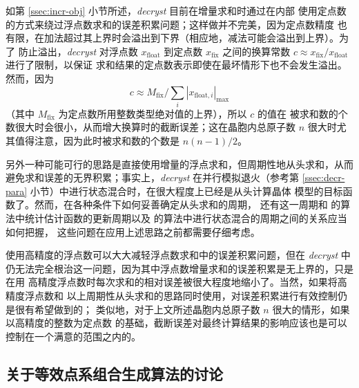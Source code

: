 如第 \ref{ssec:incr-obj} 小节所述，\emph{decryst} 目前在增量求和时通过在内部
使用定点数的方式来绕过浮点数求和的误差积累问题；这样做并不完美，因为定点数精度
也有限，在加法超过其上界时会溢出到下界（相应地，减法可能会溢出到上界）。为了
防止溢出，\emph{decryst} 对浮点数 $x_\text{float}$ 到定点数 $x_\text{fix}$
之间的换算常数 $c \approx x_\text{fix} / x_\text{float}$ 进行了限制，以保证
求和结果的定点数表示即使在最坏情形下也不会发生溢出。然而，因为
\begin{equation}
	c \approx M_\text{fix} \Big/ \sum_i |x_{\text{float},i}|_\text{max}
\end{equation}
（其中 $M_\text{fix}$ 为定点数所用整数类型绝对值的上界），所以 $c$ 的值在
被求和数的个数很大时会很小，从而增大换算时的截断误差；这在晶胞内总原子数
$n$ 很大时尤其值得注意，因为此时被求和数的个数是 $n (n - 1) / 2$。

另外一种可能可行的思路是直接使用增量的浮点求和，但周期性地从头求和，从而
避免求和误差的无界积累；事实上，\emph{decryst} 在并行模拟退火（参考第
\ref{ssec:decr-para} 小节）中进行状态混合时，在很大程度上已经是从头计算晶体
模型的目标函数了。然而，在各种条件下如何妥善确定从头求和的周期，
还有这一周期和 \textcite{lam1988}的算法中统计估计函数的更新周期以及
\textcite{chu1999}的算法中进行状态混合的周期之间的关系应当如何把握，
这些问题在应用上述思路之前都需要仔细考虑。

使用高精度的浮点数可以大大减轻浮点数求和中的误差积累问题，但在 \emph{decryst}
中仍无法完全根治这一问题，因为其中浮点数增量求和的误差积累是无上界的，只是在用
高精度浮点数时每次求和的相对误差被很大程度地缩小了。当然，如果将高精度浮点数和
以上周期性从头求和的思路同时使用，对误差积累进行有效控制仍是很有希望做到的；
类似地，对于上文所述晶胞内总原子数 $n$ 很大的情形，如果以高精度的整数为定点数
的基础，截断误差对最终计算结果的影响应该也是可以控制在一个满意的范围之内的。

\subsection{关于等效点系组合生成算法的讨论}\label{ssec:epc-discus}

